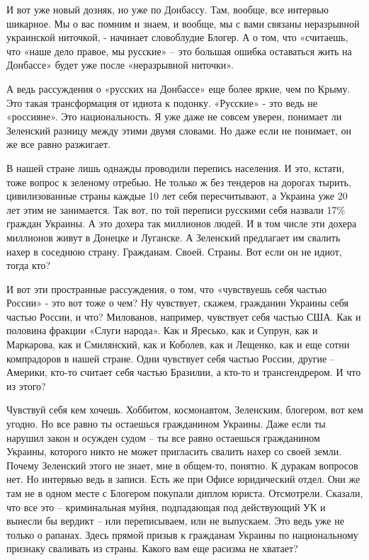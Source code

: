 И вот уже новый дозняк, но уже по Донбассу. Там, вообще, все интервью шикарное.
Мы о вас помним и знаем, и вообще, мы с вами связаны неразрывной украинской
ниточкой, - начинает словоблудие Блогер. А о том, что «считаешь, что «наше дело
правое, мы русские» – это большая ошибка оставаться жить на Донбассе» будет уже
после «неразрывной ниточки».

А ведь рассуждения о «русских на Донбассе» еще более яркие, чем по Крыму. Это
такая трансформация от идиота к подонку. «Русские» - это ведь не «россияне».
Это национальность. Я уже даже не совсем уверен, понимает ли Зеленский разницу
между этими двумя словами. Но даже если не понимает, он же все равно разжигает.

В нашей стране лишь однажды проводили перепись населения. И это, кстати, тоже
вопрос к зеленому отребью. Не только ж без тендеров на дорогах тырить,
цивилизованные страны каждые 10 лет себя пересчитывают, а Украина уже 20 лет
этим не занимается. Так вот, по той переписи русскими себя назвали 17\% граждан
Украины. А это дохера так миллионов людей. И в том числе эти дохера миллионов
живут в Донецке и Луганске. А Зеленский предлагает им свалить нахер в соседнюю
страну. Гражданам. Своей. Страны. Вот если он не идиот, тогда кто?

И вот эти пространные рассуждения, о том, что «чувствуешь себя частью России» -
это вот тоже о чем? Ну чувствует, скажем, гражданин Украины себя частью России,
и что? Милованов, например, чувствует себя частью США. Как и половина фракции
«Слуги народа». Как и Яресько, как и Супрун, как и Маркарова, как и Смилянский,
как и Коболев, как и Лещенко, как и еще сотни компрадоров в нашей стране. Одни
чувствует себя частью России, другие – Америки, кто-то считает себя частью
Бразилии, а кто-то и трансгендрером. И что из этого?

Чувствуй себя кем хочешь. Хоббитом, космонавтом, Зеленским, блогером, вот кем
угодно. Но все равно ты остаешься гражданином Украины. Даже если ты нарушил
закон и осужден судом – ты все равно остаешься гражданином Украины, которого
никто не может пригласить свалить нахер со своей земли. Почему Зеленский этого
не знает, мне в общем-то, понятно. К дуракам вопросов нет. Но интервью ведь в
записи. Есть же при Офисе юридический отдел. Они же там не в одном месте с
Блогером покупали диплом юриста. Отсмотрели. Сказали, что все это –
криминальная муйня, подпадающая под действующий УК и вынесли бы вердикт – или
переписываем, или не выпускаем. Это ведь уже не только о рапанах. Здесь прямой
призыв к гражданам Украины по национальному признаку сваливать из страны.
Какого вам еще расизма не хватает?

